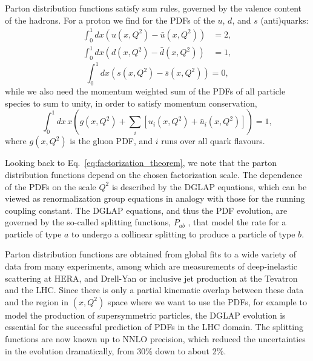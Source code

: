 Parton distribution functions satisfy sum rules, governed by the valence content of the
hadrons. For a proton we find for the PDFs of the $u$, $d$,
and $s$ (anti)quarks: 
\begin{align}
  \int_0^1 dx \left( u(x,Q^2) - \bar{u}(x,Q^2)\right) &= 2, \\[-2pt]
  \int_0^1 dx \left( d(x,Q^2) - \bar{d}(x,Q^2)\right) &= 1, %
\end{align}
\begin{equation}
  \int_0^1 dx \left( s(x,Q^2) - \bar{s}(x,Q^2)\right) = 0, 
\end{equation}
while we also need the momentum weighted sum of the PDFs of all particle species to sum to unity, in
order to satisfy momentum conservation, 
\begin{equation}
  \int_0^1 dx \, x \left( g(x,Q^2) + \sum_i [u_i(x,Q^2) + \bar{u}_i(x,Q^2)]\right) = 1 ,
\end{equation}
where $g(x,Q^2)$ is the gluon PDF, and $i$ runs over all quark flavours. 

Looking back to Eq.~\ref{eq:factorization_theorem}, we note that the parton distribution
functions depend on the chosen factorization scale. The dependence of the PDFs on the scale $Q^2$
is described by the DGLAP equations, which can be viewed as renormalization group equations in
analogy with those for the running coupling constant. 
The DGLAP equations, and thus the PDF evolution, are governed by the so-called splitting functions,
$P_{ab}$ , that model the rate for a particle of type $a$ to undergo a collinear splitting to
produce a particle of type $b$. 

Parton distribution functions are obtained from global fits to a wide variety of data from
many experiments, among which are measurements of deep-inelastic scattering at HERA, and Drell-Yan
or inclusive jet production at the Tevatron and the LHC. 
Since there is only a partial kinematic overlap between these data and the region in $(x,Q^2)$ space
where we want to use the PDFs, for example to model the production of supersymmetric particles,
the DGLAP evolution is essential for the successful prediction of PDFs in the LHC domain. 
The splitting functions are now known up to NNLO precision, which reduced the uncertainties in the
evolution dramatically, from 30\% down to about 2\%.

